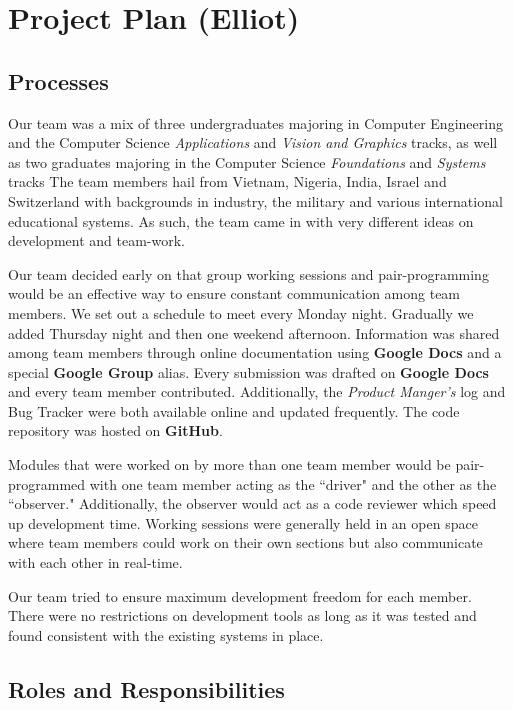 \documentclass[12pt]{report}
\begin{document}
\chapter{Project Plan (Elliot)}

\section{Processes}

Our team was a mix of three undergraduates majoring in Computer Engineering and the Computer Science \textit{Applications} and \textit{Vision and Graphics} tracks, as well as two graduates majoring in the Computer Science \textit{Foundations} and \textit{Systems} tracks The team members hail from Vietnam, Nigeria, India, Israel and Switzerland with backgrounds in industry, the military and various international educational systems. As such, the team came in with very different ideas on development and team-work.

Our team decided early on that group working sessions and pair-programming would be an effective way to ensure constant communication among team members. We set out a schedule to meet every Monday night. Gradually we added Thursday night and then one weekend afternoon. Information was shared among team members through online documentation using \textbf{Google Docs} and a special \textbf{Google Group} alias. Every submission was drafted on \textbf{Google Docs} and every team member contributed. Additionally, the \textit{Product Manger's} log and Bug Tracker were both available online and updated frequently. The code repository was hosted on \textbf{GitHub}. 

Modules that were worked on by more than one team member would be pair-programmed with one team member acting as the ``driver" and the other as the ``observer." Additionally, the observer would act as a code reviewer which speed up development time. Working sessions were generally held in an open space where team members could work on their own sections but also communicate with each other in real-time.

Our team tried to ensure maximum development freedom for each member. There were no restrictions on development tools as long as it was tested and found consistent with the existing systems in place. 

\section{Roles and Responsibilities}
\end{document}
